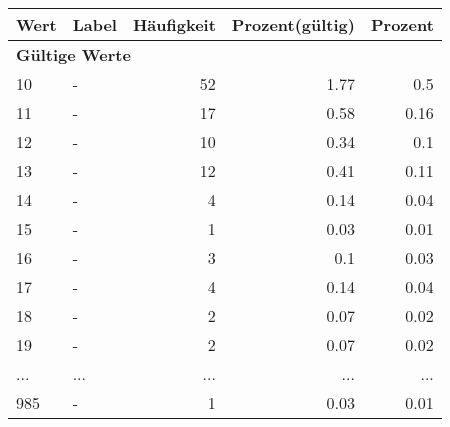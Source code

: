      \begin{longtable}{lXrrr}
     \toprule
     \textbf{Wert} & \textbf{Label} & \textbf{Häufigkeit} & \textbf{Prozent(gültig)} & \textbf{Prozent} \\
     \endhead
     \midrule
     \multicolumn{5}{l}{\textbf{Gültige Werte}}\\
        10 & \multicolumn{1}{X}{-} & %
          \num{52} &
          \num[round-mode=places,round-precision=2]{1,77} &
          \num[round-mode=places,round-precision=2]{0,5} \\
        11 & \multicolumn{1}{X}{-} & %
          \num{17} &
          \num[round-mode=places,round-precision=2]{0,58} &
          \num[round-mode=places,round-precision=2]{0,16} \\
        12 & \multicolumn{1}{X}{-} & %
          \num{10} &
          \num[round-mode=places,round-precision=2]{0,34} &
          \num[round-mode=places,round-precision=2]{0,1} \\
        13 & \multicolumn{1}{X}{-} & %
          \num{12} &
          \num[round-mode=places,round-precision=2]{0,41} &
          \num[round-mode=places,round-precision=2]{0,11} \\
        14 & \multicolumn{1}{X}{-} & %
          \num{4} &
          \num[round-mode=places,round-precision=2]{0,14} &
          \num[round-mode=places,round-precision=2]{0,04} \\
        15 & \multicolumn{1}{X}{-} & %
          \num{1} &
          \num[round-mode=places,round-precision=2]{0,03} &
          \num[round-mode=places,round-precision=2]{0,01} \\
        16 & \multicolumn{1}{X}{-} & %
          \num{3} &
          \num[round-mode=places,round-precision=2]{0,1} &
          \num[round-mode=places,round-precision=2]{0,03} \\
        17 & \multicolumn{1}{X}{-} & %
          \num{4} &
          \num[round-mode=places,round-precision=2]{0,14} &
          \num[round-mode=places,round-precision=2]{0,04} \\
        18 & \multicolumn{1}{X}{-} & %
          \num{2} &
          \num[round-mode=places,round-precision=2]{0,07} &
          \num[round-mode=places,round-precision=2]{0,02} \\
        19 & \multicolumn{1}{X}{-} & %
          \num{2} &
          \num[round-mode=places,round-precision=2]{0,07} &
          \num[round-mode=places,round-precision=2]{0,02} \\
       ... & ... & ... & ... & ... \\
        985 & \multicolumn{1}{X}{-} & %
          \num{1} &
          \num[round-mode=places,round-precision=2]{0,03} &
          \num[round-mode=places,round-precision=2]{0,01} \\


\end{longtable}
